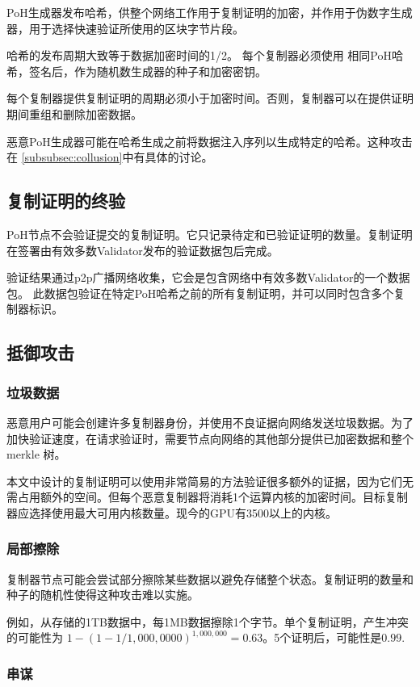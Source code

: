 \documentclass[12pt, uft8]{ctexart}
\begin{document}
PoH生成器发布哈希，供整个网络工作用于复制证明的加密，并作用于伪数字生成器，用于选择快速验证所使用的区块字节片段。    

哈希的发布周期大致等于数据加密时间的1/2。 每个复制器必须使用 相同PoH哈希，签名后，作为随机数生成器的种子和加密密钥。

每个复制器提供复制证明的周期必须小于加密时间。否则，复制器可以在提供证明期间重组和删除加密数据。

恶意PoH生成器可能在哈希生成之前将数据注入序列以生成特定的哈希。这种攻击在 \ref{subsubsec:collusion}中有具体的讨论。

\subsection{复制证明的终验}
PoH节点不会验证提交的复制证明。它只记录待定和已验证证明的数量。复制证明在签署由有效多数Validator发布的验证数据包后完成。 

验证结果通过p2p广播网络收集，它会是包含网络中有效多数Validator的一个数据包。 此数据包验证在特定PoH哈希之前的所有复制证明，并可以同时包含多个复制器标识。
\subsection{抵御攻击}
\subsubsection{垃圾数据}
恶意用户可能会创建许多复制器身份，并使用不良证据向网络发送垃圾数据。为了加快验证速度，在请求验证时，需要节点向网络的其他部分提供已加密数据和整个 merkle 树。

本文中设计的复制证明可以使用非常简易的方法验证很多额外的证据，因为它们无需占用额外的空间。但每个恶意复制器将消耗1个运算内核的加密时间。目标复制器应选择使用最大可用内核数量。现今的GPU有3500以上的内核。

\subsubsection{局部擦除}

复制器节点可能会尝试部分擦除某些数据以避免存储整个状态。复制证明的数量和种子的随机性使得这种攻击难以实施。

例如，从存储的1TB数据中，每1MB数据擦除1个字节。单个复制证明，产生冲突的可能性为 \(1 - (1- 1/1,000,0000)^{1,000,000} = 0.63\)。5个证明后，可能性是\(0.99\).

\subsubsection{串谋}
\end{document}
